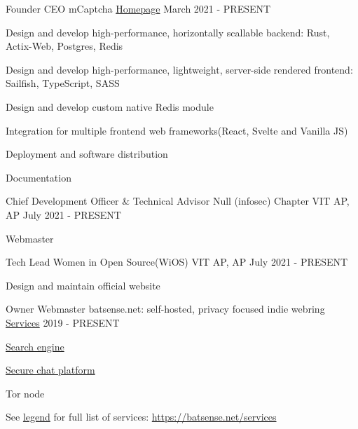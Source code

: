 
\begin{cventries}

     \cventry
    {Founder CEO} %
    {mCaptcha} %
    {\href{https://mcaptcha.org}{Homepage}} %
    {March 2021 - PRESENT} %
    {
      \begin{cvitems}%
        \item {Design and develop high-performance, horizontally scallable backend: Rust, Actix-Web, Postgres, Redis}
        \item {Design and develop high-performance, lightweight, server-side rendered frontend: Sailfish, TypeScript, SASS}
        \item {Design and develop custom native Redis module}
        \item {Integration for multiple frontend web frameworks(React, Svelte and Vanilla JS)}
        \item {Deployment and software distribution}
        \item {Documentation}
      \end{cvitems}
    }
 
     \cventry
    {Chief Development Officer \& Technical Advisor} %
    {Null (infosec) Chapter} %
    {VIT AP, AP} %
    {July 2021 - PRESENT} %
    {
      \begin{cvitems} %
       \item {Webmaster}
      \end{cvitems}
    }
 
     \cventry
    {Tech Lead} %
    {Women in Open Source(WiOS)} %
    {VIT AP, AP} %
    {July 2021 - PRESENT} %
    {
      \begin{cvitems} %
       \item {Design and maintain official website}
      \end{cvitems}
    }
   
    \cventry
    {Owner Webmaster} %
    {batsense.net: self-hosted, privacy focused indie webring} %
    {\href{https://batsense.net/services}{Services}} %
    {2019 - PRESENT} %
    {
      \begin{cvitems}%
        \item {{\href{https://searx.batsense.net}{Search engine}}}
        \item {{\href{https://matrix.batsense.net}{Secure chat platform}}}
        \item {Tor node}
        \item {See {\href{https://batsense.net/services}{legend} for full list of services}: \href{https://batsense.net/services}{https://batsense.net/services}}
       \end{cvitems}
    }


\end{cventries}
